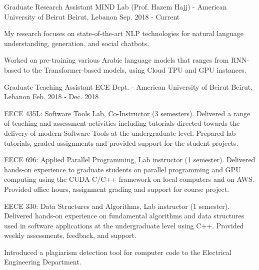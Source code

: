 

\begin{cventries}

  \cventry
    {Graduate Research Assistant} %
    {MIND Lab (Prof. Hazem Hajj) - American University of Beirut} %
    {Beirut, Lebanon} %
    {Sep. 2018 - Current} %
    {
      \begin{cvitems} %
        \item {My research focuses on state-of-the-art NLP technologies for natural language understanding, generation, and social chatbots.}
        \item {Worked on pre-training various Arabic language models that ranges from RNN-based to the Transformer-based models, using Cloud TPU and GPU instances.}
      \end{cvitems}
    }

  \cventry
    {Graduate Teaching Assistant} %
    {ECE Dept. - American University of Beirut} %
    {Beirut, Lebanon} %
    {Feb. 2018 - Dec. 2018} %
    { 
      \begin{cvitems} %
        \item {EECE 435L: Software Tools Lab, Co-Instructor (3 semesters).  Delivered a range of teaching and assessment activities including tutorials directed towards the delivery of modern Software Tools at the undergraduate level. Prepared lab tutorials, graded assignments and provided support for the student projects.}
        \item {EECE 696: Applied Parallel Programming, Lab instructor (1 semester). Delivered hands-on experience to graduate students on parallel programming and GPU computing using the CUDA C/C++ framework on local computers and on AWS. Provided office hours, assignment grading and support for course project.}
        \item {EECE 330: Data Structures and Algorithms, Lab instructor (1 semester). Delivered hands-on experience on fundamental algorithms and data structures used in software applications at the undergraduate level using C++. Provided weekly assessments, feedback, and support.}
        \item{Introduced a plagiarism detection tool for computer code to the Electrical Engineering Department.}
      \end{cvitems}
    }


\end{cventries}
